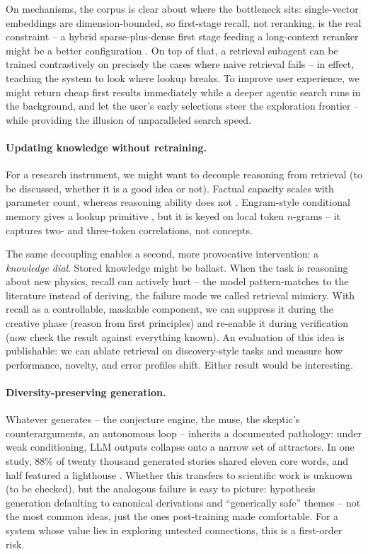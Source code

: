 On mechanisms, the corpus is clear about where the bottleneck sits: single-vector embeddings are dimension-bounded, so first-stage recall, not reranking, is the real constraint -- a hybrid sparse-plus-dense first stage feeding a long-context reranker might be a better configuration \cite{2508.21038}. On top of that, a retrieval subagent can be trained contrastively on precisely the cases where naive retrieval fails \cite{2512.16301} -- in effect, teaching the system to look where lookup breaks. To improve user experience, we might return cheap first results immediately while a deeper agentic search runs in the background, and let the user's early selections steer the exploration frontier -- while providing the illusion of unparalleled search speed.

\paragraph{Updating knowledge without retraining.}
For a research instrument, we might want to decouple reasoning from retrieval (to be discussed, whether it is a good idea or not). Factual capacity scales with parameter count, whereas reasoning ability does not \cite{lesswrong2026incompressible, Zhou2026}. Engram-style conditional memory gives a lookup primitive \cite{2601.07372}, but it is keyed on local token $n$-grams -- it captures two- and three-token correlations, not concepts.

The same decoupling enables a second, more provocative intervention: a \emph{knowledge dial}. Stored knowledge might be ballast. When the task is reasoning about new physics, recall can actively hurt -- the model pattern-matches to the literature instead of deriving, the failure mode we called retrieval mimicry. With recall as a controllable, maskable component, we can suppress it during the creative phase (reason from first principles) and re-enable it during verification (now check the result against everything known). An evaluation of this idea is publishable: we can ablate retrieval on discovery-style tasks and measure how performance, novelty, and error profiles shift. Either result would be interesting.

\paragraph{Diversity-preserving generation.}
Whatever generates -- the conjecture engine, the muse, the skeptic's counterarguments, an autonomous loop -- inherits a documented pathology: under weak conditioning, LLM outputs collapse onto a narrow set of attractors. In one study, 88\% of twenty thousand generated stories shared eleven core words, and half featured a lighthouse \cite{2605.26492}. Whether this transfers to scientific work is unknown (to be checked), but the analogous failure is easy to picture: hypothesis generation defaulting to canonical derivations and ``generically safe'' themes -- not the most common ideas, just the ones post-training made comfortable. For a system whose value lies in exploring untested connections, this is a first-order risk.

